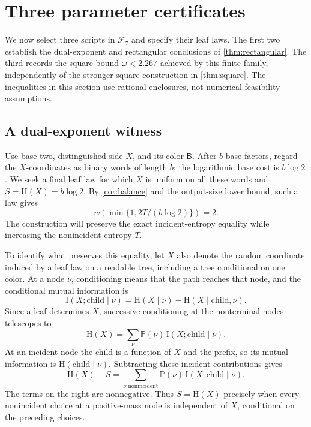 \documentclass[11pt]{article}
\numberwithin{equation}{section}
\theoremstyle{definition}
\theoremstyle{remark}
\newcommand{\HH}{\mathrm H}
\newcommand{\II}{\mathrm I}
\newcommand{\Prb}{\mathbb P}
\newcommand{\colB}{\mathsf B}
\newcommand{\calF}{\mathcal F}
\begin{document}
\section{Three parameter certificates}\label{sec:certificates}

We now select three scripts in \(\calF_7\) and specify their leaf laws.
The first two establish the dual-exponent and rectangular conclusions
of \cref{thm:rectangular}.  The third records the square bound
\(\omega<2.267\) achieved by this finite family, independently of the
stronger square construction in \cref{thm:square}.
The inequalities in this section use rational enclosures, not numerical
feasibility assumptions.

\subsection{A dual-exponent witness}\label{subsec:dual}

Use base two, distinguished side \(X\), and its color \(\colB\).
After \(b\) base factors, regard the \(X\)-coordinates as binary words
of length \(b\); the logarithmic base cost is \(b\log2\).
We seek a final leaf law for which \(X\) is uniform on all these words
and \(S=\HH(X)=b\log2\).
By \cref{cor:balance} and the output-size lower bound, such a law gives
\[
 w\!\left(\min\{1,2T/(b\log2)\}\right)=2.
\]
The construction will preserve the exact incident-entropy equality
while increasing the nonincident entropy \(T\).

To identify what preserves this equality, let \(X\) also denote the
random coordinate induced by a leaf law on a readable tree, including
a tree conditional on one color.
At a node \(\nu\), conditioning means that the path reaches that node,
and the conditional mutual information is
\[
 \II(X;\text{child}\mid\nu)
 =\HH(X\mid\nu)-\HH(X\mid\text{child},\nu).
\]
Since a leaf determines \(X\), successive conditioning at the
nonterminal nodes telescopes to
\[
 \HH(X)=\sum_\nu\Prb(\nu)\,
                  \II(X;\text{child}\mid\nu).
\]
At an incident node the child is a function of \(X\) and the prefix,
so its mutual information is \(\HH(\text{child}\mid\nu)\).
Subtracting these incident contributions gives
\begin{equation}\label{eq:information-leakage}
 \HH(X)-S
  =\sum_{\nu\text{ nonincident}}
       \Prb(\nu)\,\II(X;\text{child}\mid\nu).
\end{equation}
The terms on the right are nonnegative.  Thus \(S=\HH(X)\) precisely
when every nonincident choice at a positive-mass node is independent
of \(X\), conditional on the preceding choices.
\end{document}
